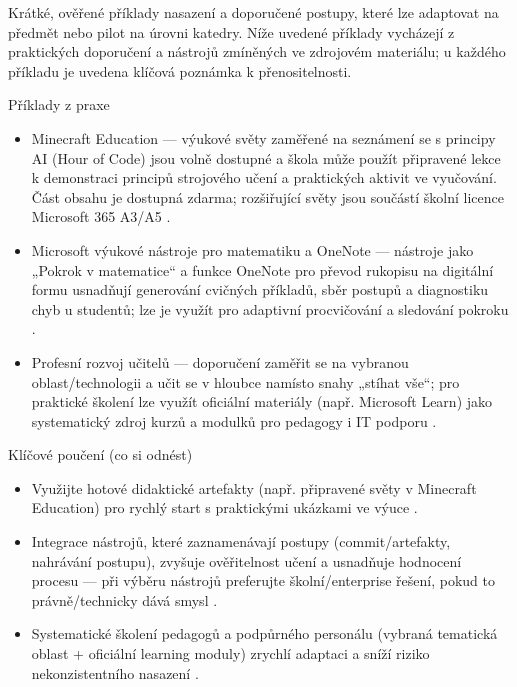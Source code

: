 Krátké, ověřené příklady nasazení a doporučené postupy, které lze adaptovat na předmět nebo pilot na úrovni katedry. Níže uvedené příklady vycházejí z praktických doporučení a nástrojů zmíněných ve zdrojovém materiálu; u každého příkladu je uvedena klíčová poznámka k přenositelnosti.

Příklady z praxe
\begin{itemize}
  \item Minecraft Education — výukové světy zaměřené na seznámení se s principy AI (Hour of Code) jsou volně dostupné a škola může použít připravené lekce k demonstraci principů strojového učení a praktických aktivit ve vyučování. Část obsahu je dostupná zdarma; rozšiřující světy jsou součástí školní licence Microsoft 365 A3/A5 \cite{kb_ai_101_tipu_pdf_04e4a115_page_15_2}.
  \item Microsoft výukové nástroje pro matematiku a OneNote — nástroje jako „Pokrok v matematice“ a funkce OneNote pro převod rukopisu na digitální formu usnadňují generování cvičných příkladů, sběr postupů a diagnostiku chyb u studentů; lze je využít pro adaptivní procvičování a sledování pokroku \cite{kb_ai_101_tipu_pdf_04e4a115_page_8_1}.
  \item Profesní rozvoj učitelů — doporučení zaměřit se na vybranou oblast/technologii a učit se v hloubce namísto snahy „stíhat vše“; pro praktické školení lze využít oficiální materiály (např. Microsoft Learn) jako systematický zdroj kurzů a modulků pro pedagogy i IT podporu \cite{kb_ai_101_tipu_pdf_04e4a115_page_54_1}.
\end{itemize}

Klíčové poučení (co si odnést)
\begin{itemize}
  \item Využijte hotové didaktické artefakty (např. připravené světy v Minecraft Education) pro rychlý start s praktickými ukázkami ve výuce \cite{kb_ai_101_tipu_pdf_04e4a115_page_15_2}.
  \item Integrace nástrojů, které zaznamenávají postupy (commit/artefakty, nahrávání postupu), zvyšuje ověřitelnost učení a usnadňuje hodnocení procesu — při výběru nástrojů preferujte školní/enterprise řešení, pokud to právně/technicky dává smysl \cite{kb_ai_101_tipu_pdf_04e4a115_page_15_2,kb_ai_101_tipu_pdf_04e4a115_page_8_1}.
  \item Systematické školení pedagogů a podpůrného personálu (vybraná tematická oblast + oficiální learning moduly) zrychlí adaptaci a sníží riziko nekonzistentního nasazení \cite{kb_ai_101_tipu_pdf_04e4a115_page_54_1}.
\end{itemize}

